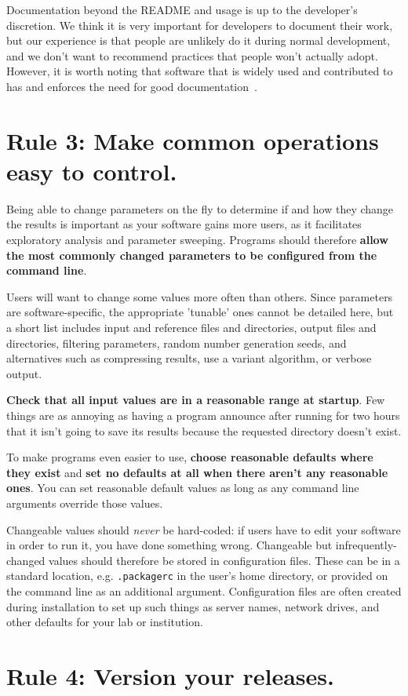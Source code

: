 \documentclass[10pt,letterpaper]{article}
\newcommand{\rulemajor}[1]{\section{#1}}
\newcommand{\ruleminor}[1]{\textbf{#1}}
\begin{document}
Documentation beyond the README and usage is up to the developer's discretion.
We think it is very important for developers to document their work, but our
experience is that people are unlikely do it during normal development, and we
don’t want to recommend practices that people won’t actually adopt. However, it
is worth noting that software that is widely used and contributed to has and
enforces the need for good documentation~\cite{gentleman2004}.

\rulemajor{Rule 3: Make common operations easy to control.}

Being able to change parameters on the fly to determine if and how
they change the results is important as your software gains more users,
as it facilitates exploratory analysis and parameter sweeping.
Programs should therefore
\ruleminor{allow the most commonly changed parameters to be configured from the command line}.

Users will want to change some values more often than others.
Since parameters are software-specific, the appropriate 'tunable' ones cannot be detailed here,
but a short list includes input and reference files and directories,
output files and directories,
filtering parameters,
random number generation seeds,
and
alternatives such as compressing results,
use a variant algorithm,
or verbose output.

\ruleminor{Check that all input values are in a reasonable range at startup}. 
Few things are as annoying as having a program announce after running for two
hours that it isn't going to save its results because the requested directory
doesn't exist.

To make programs even easier to use,
\ruleminor{choose reasonable defaults where they exist}
and \ruleminor{set no defaults at all when there aren't any reasonable ones}.
You can set reasonable default values
as long as any command line arguments
override those values.

Changeable values should \emph{never} be hard-coded:
if users have to edit your software in order to run it,
you have done something wrong.
Changeable but infrequently-changed values should therefore be stored in configuration files.
These can be in a standard location,
e.g. \texttt{.packagerc} in the user's home directory,
or provided on the command line as an additional argument.
Configuration files are often created during installation
to set up such things as server names,
network drives,
and other defaults for your lab or institution. 

\rulemajor{Rule 4: Version your releases.}
\end{document}
